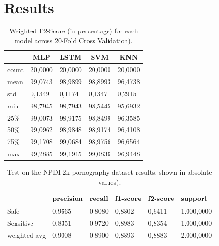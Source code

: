 \newpage

\chapter{Results}
\label{chap:results}


\begin{table}[]
\centering
\label{tab:cross-validation}
\caption{Weighted F2-Score (in percentage) for each model across 20-Fold Cross Validation).}
\begin{tabular}{l|l|l|l|l}
      & \multicolumn{1}{c|}{MLP} & \multicolumn{1}{c|}{LSTM} & \multicolumn{1}{c|}{SVM} & \multicolumn{1}{c}{KNN} \\ \hline
count & 20,0000                  & 20,0000                   & 20,0000                  & 20,0000                 \\ \hline
mean  & 99,0743                  & 98,9899                   & 98,8993                  & 96,4738                 \\ \hline
std   & 0,1349                   & 0,1174                    & 0,1347                   & 0,2915                  \\ \hline
min   & 98,7945                  & 98,7943                   & 98,5445                  & 95,6932                 \\ \hline
25\%  & 99,0073                  & 98,9175                   & 98,8499                  & 96,3585                 \\ \hline
50\%  & 99,0962                  & 98,9848                   & 98,9174                  & 96,4108                 \\ \hline
75\%  & 99,1708                  & 99,0684                   & 98,9756                  & 96,6564                 \\ \hline
max   & 99,2885                  & 99,1915                   & 99,0836                  & 96,9448                
\end{tabular}
\end{table}

\begin{table}[]
\centering
\label{tab:test-2k}
\caption{Test on the NPDI 2k-pornography dataset results, shown in absolute values).}
\begin{tabular}{l|l|l|l|l|l}
             & precision & recall & f1-score & f2-score & support    \\ \hline
Safe         & 0,9665    & 0,8080 & 0,8802   & 0,9411   & 1.000,0000 \\ \hline
Sensitive    & 0,8351    & 0,9720 & 0,8983   & 0,8354   & 1.000,0000 \\ \hline
weighted avg & 0,9008    & 0,8900 & 0,8893   & 0,8883   & 2.000,0000
\end{tabular}
\end{table}

